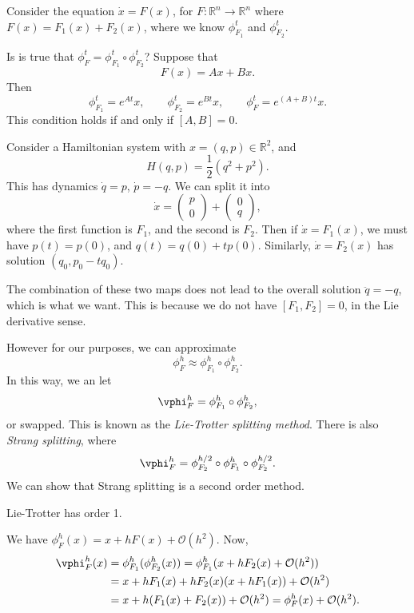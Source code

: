 \documentclass[12pt]{article}
\begin{document}
Consider the equation $\dot x = F(x)$, for $F : \mathbb{R}^{n} \to \mathbb{R}^{n}$ where $F(x) = F_1(x) + F_2(x)$, where we know $\phi_{F_1}^{t}$ and $\phi_{F_2}^{t}$.

Is is true that $\phi_F^{t} = \phi_{F_1}^{t} \circ \phi_{F_2}^{t}$? Suppose that
\[
F(x) = Ax + Bx.
\]
Then
\[
\phi_{F_1}^{t} = e^{At}x, \qquad \phi_{F_2}^{t} = e^{Bt}x, \qquad \phi_{F}^{t} = e^{(A + B)t}x.
\]
This condition holds if and only if $[A, B] = 0$.

\begin{exbox}
Consider a Hamiltonian system with $x = (q, p) \in \mathbb{R}^2$, and
\[
H(q, p) = \frac12(q^2 + p^2).
\]
This has dynamics $\dot q= p$, $\dot p = -q$. We can split it into
\[
\dot x =
\begin{pmatrix}
	p \\ 0
\end{pmatrix}
+
\begin{pmatrix}
	0 \\ q
\end{pmatrix},
\]
where the first function is $F_1$, and the second is $F_2$. Then if $\dot x = F_1(x)$, we must have $p(t) = p(0)$, and $q(t) = q(0) + t p(0)$. Similarly, $\dot x = F_2(x)$ has solution $(q_0, p_0 - tq_0)$.

The combination of these two maps does not lead to the overall solution $\ddot q = -q$, which is what we want. This is because we do not have $[F_1, F_2] = 0$, in the Lie derivative sense.
\end{exbox}

However for our purposes, we can approximate
\[
\phi_F^{h} \approx \phi_{F_1}^{h} \circ \phi_{F_2}^{h}.
\]
In this way, we an let
\[
\vphi_F^{h} = \phi_{F_1}^{h} \circ \phi_{F_2}^{h},
\]
or swapped. This is known as the \emph{Lie-Trotter splitting method}. There is also \emph{Strang splitting}, where
\[
\vphi_F^{h} = \phi_{F_2}^{h/2} \circ \phi_{F_1}^{h} \circ \phi_{F_2}^{h/2}.
\]
We can show that Strang splitting is a second order method.

\begin{proposition}
	Lie-Trotter has order 1.
\end{proposition}

\begin{proofbox}
	We have $\phi_F^{h}(x) = x + h F(x) + \mathcal{O}(h^2)$. Now,
	\begin{align*}
		\vphi_F^{h}(x) &= \phi_{F_1}^{h}( \phi_{F_2}^{h}(x)) = \phi_{F_1}^{h}(x + h F_2(x) + \mathcal{O}(h^2)) \\
			       &= x + h F_1(x) + h F_2(x) (x + h F_1(x)) + \mathcal{O}(h^2) \\
			       &= x + h (F_1(x) + F_2(x)) + \mathcal{O}(h^2) = \phi_F^{h}(x) + \mathcal{O}(h^2).
	\end{align*}
\end{proofbox}
\end{document}
